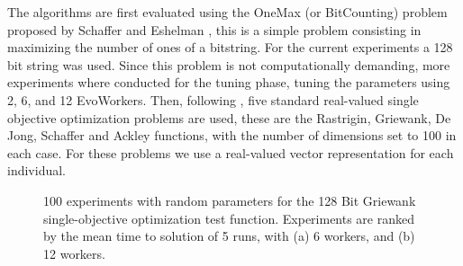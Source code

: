 \documentclass{llncs}
\begin{document}
The algorithms are first evaluated using the OneMax (or BitCounting) problem proposed by 
Schaffer and Eshelman \cite{SE91}, this is a simple problem consisting in maximizing the number 
of ones of a bitstring. For the current experiments a 128 bit string was used. Since this
problem is not computationally demanding, more experiments where conducted for the tuning phase, 
tuning the parameters using 2, 6, and 12 EvoWorkers. Then, following \cite{fuku1}, 
five standard real-valued single objective optimization problems 
are used, these are the Rastrigin, Griewank, De Jong, Schaffer  and Ackley functions, 
with the number of dimensions set to 100 in each case. For these problems we use a real-valued vector
representation for each individual.


\begin{figure}[t]
    \centering

    \caption{100 experiments with random parameters for the 128 Bit Griewank 
    single-objective optimization test function. Experiments are ranked by 
    the mean time to solution of 5 runs, with (a) 6 workers, and (b) 12 workers.}
    \label{fig:griewank}
\end{figure}
\end{document}
